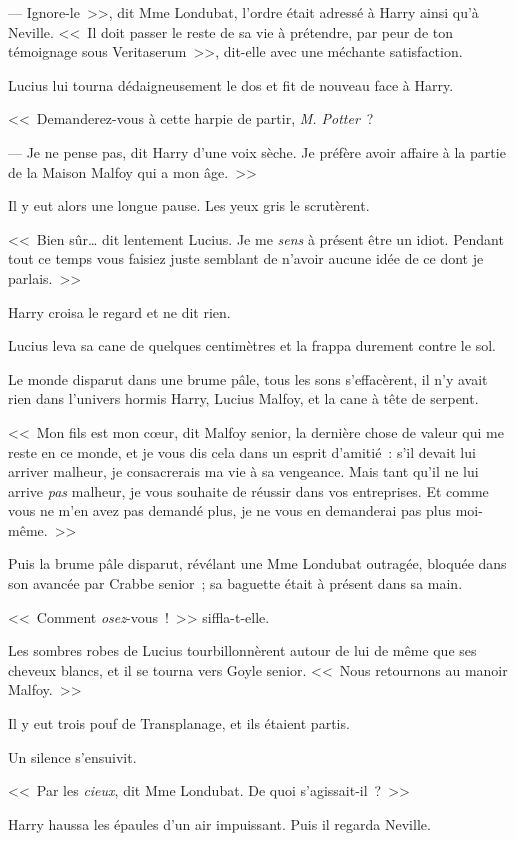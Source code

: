 --- Ignore-le~>>, dit Mme Londubat, l'ordre était adressé à Harry ainsi qu'à Neville. <<~Il doit passer le reste de sa vie à prétendre, par peur de ton témoignage sous Veritaserum~>>, dit-elle avec une méchante satisfaction.

Lucius lui tourna dédaigneusement le dos et fit de nouveau face à Harry.

<<~Demanderez-vous à cette harpie de partir, \emph{M. Potter}~?

--- Je ne pense pas, dit Harry d'une voix sèche. Je préfère avoir affaire à la partie de la Maison Malfoy qui a mon âge.~>>

Il y eut alors une longue pause. Les yeux gris le scrutèrent.

<<~Bien sûr… dit lentement Lucius. Je me \emph{sens} à présent être un idiot. Pendant tout ce temps vous faisiez juste semblant de n'avoir aucune idée de ce dont je parlais.~>>

Harry croisa le regard et ne dit rien.

Lucius leva sa cane de quelques centimètres et la frappa durement contre le sol.

Le monde disparut dans une brume pâle, tous les sons s'effacèrent, il n'y avait rien dans l'univers hormis Harry, Lucius Malfoy, et la cane à tête de serpent.

<<~Mon fils est mon cœur, dit Malfoy senior, la dernière chose de valeur qui me reste en ce monde, et je vous dis cela dans un esprit d'amitié~: s'il devait lui arriver malheur, je consacrerais ma vie à sa vengeance. Mais tant qu'il ne lui arrive \emph{pas} malheur, je vous souhaite de réussir dans vos entreprises. Et comme vous ne m'en avez pas demandé plus, je ne vous en demanderai pas plus moi-même.~>>

Puis la brume pâle disparut, révélant une Mme Londubat outragée, bloquée dans son avancée par Crabbe senior~; sa baguette était à présent dans sa main.

<<~Comment \emph{osez}-vous~!~>> siffla-t-elle.

Les sombres robes de Lucius tourbillonnèrent autour de lui de même que ses cheveux blancs, et il se tourna vers Goyle senior. <<~Nous retournons au manoir Malfoy.~>>

Il y eut trois pouf de Transplanage, et ils étaient partis.

Un silence s'ensuivit.

<<~Par les \emph{cieux}, dit Mme Londubat. De quoi s'agissait-il~?~>>

Harry haussa les épaules d'un air impuissant. Puis il regarda Neville.

